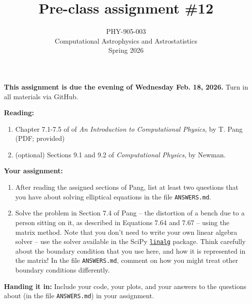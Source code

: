 \documentclass[10pt]{article}
\title{Pre-class assignment \#12}
\author{PHY-905-003\\Computational Astrophysics and
  Astrostatistics\\Spring 2026}
\date{} %
\begin{document}
 
\maketitle

\vspace{-5mm}

\noindent
\textbf{This assignment is due the evening of Wednesday Feb. 18, 2026.}
 Turn in all materials via GitHub.

\vspace{5mm}

\noindent
\textbf{Reading:}

\begin{enumerate}


\item Chapter 7.1-7.5 of of \textit{An Introduction to Computational Physics},
  by T. Pang (PDF; provided) 

\item (optional) Sections 9.1 and 9.2 of \textit{Computational Physics}, by Newman.

\end{enumerate}

\noindent
\textbf{Your assignment:}  

\begin{enumerate}


\item After reading the assigned sections of Pang, list at least two questions that
  you have about solving elliptical equations in the file \texttt{ANSWERS.md}.

\item Solve the problem in Section 7.4 of Pang -- the distortion of a
bench due to a person sitting on it, as described in Equations 7.64
and 7.67 -- using the matrix method.  Note that you don't need to
write your own linear algebra solver -- use the solver available in
the SciPy
\href{https://docs.scipy.org/doc/scipy/reference/linalg.html}{\texttt{linalg}}
package.  Think carefully about the boundary condition that you use
here, and how it is represented in the matrix!  In the file
\texttt{ANSWERS.md}, comment on how you might treat other boundary
conditions differently.

\end{enumerate}

\vspace{5mm}

\noindent \textbf{Handing it in:} Include your code, your plots, and
your answers to the questions about (in the file \texttt{ANSWERS.md})
in your assignment.
\end{document}
